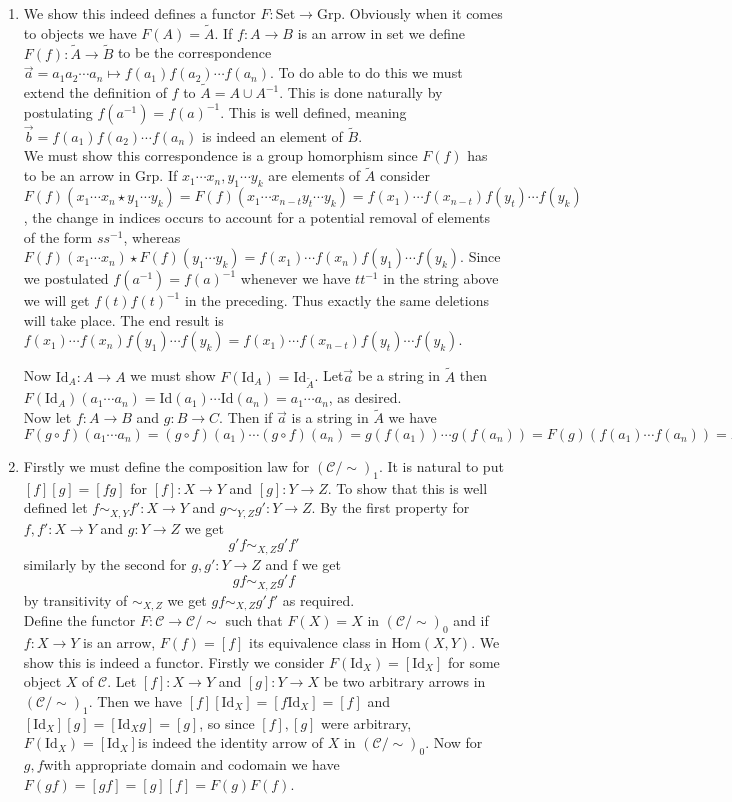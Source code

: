 \documentclass[11pt]{article}
\theoremstyle{plain}
\theoremstyle{definition}
\theoremstyle{remark}
\newcommand{\cC}{\mathcal{C}}
\newcommand{\Hom}{\mathrm{Hom}}
\begin{document}
\begin{exercises}
\begin{enumerate}
\item We show this indeed defines a functor $F:\text{Set} \to \text{Grp}$.
Obviously when it comes to objects we have $F(A)=\tilde{A}$. If $f:A \to B$ is an arrow in set we define $F(f): \tilde{A} \to \tilde{B}$ to be the correspondence $\vec{a}=a_1a_2\cdots a_n \mapsto f(a_1)f(a_2)\cdots f(a_n)$. To do able to do this we must extend the definition of $f$ to $\tilde{A}=A \cup A^{-1}$. This is done naturally by postulating $f(a^{-1})=f(a)^{-1}$. This is well defined, meaning $ \vec{b}=f(a_1)f(a_2)\cdots f(a_n)$ is indeed an element of $\tilde{B}$.\\
 We must show this correspondence is a group homorphism since $F(f)$ has to be an arrow in Grp. If $x_1 \cdots x_n, y_1\cdots y_k$ are elements of $\tilde{A}$ consider $F(f)(x_1 \cdots x_n\star y_1\cdots y_k)=F(f)(x_1\cdots x_{n-t}y_t\cdots y_k)=f(x_1)\cdots f(x_{n-t}) f(y_t) \cdots f(y_k)$, the change in indices occurs to account for a potential removal of elements of the form $ss^{-1}$, whereas $F(f)(x_1\cdots x_n) \star F(f)(y_1 \cdots y_k)=f(x_1) \cdots f(x_n) f(y_1) \cdots f(y_k)$. Since we postulated $f(a^{-1})=f(a)^{-1}$ whenever we have $tt^{-1}$ in the string above we will get $f(t)f(t)^{-1}$ in the preceding. Thus exactly the same deletions will take place. The end result is $f(x_1) \cdots f(x_n) f(y_1) \cdots f(y_k)=f(x_1) \cdots f(x_{n-t}) f(y_t) \cdots f(y_k)$.

Now $\text{Id}_A:A \to A$ we must show $F(\text{Id}_A)=\text{Id}_{\tilde{A}}$. Let$\vec{a}$ be a string in $\tilde{A}$ then $F(\text{Id}_A)(a_1\cdots a_n)=\text{Id}(a_1) \cdots \text{Id}(a_n)=a_1 \cdots a_n$, as desired.\\ 
Now let $f:A \to B$ and $g:B \to C$. Then if $\vec{a}$ is a string in $\tilde{A}$ we have $F( g \circ f)(a_1 \cdots a_n)=( g \circ f)(a_1) \cdots ( g \circ f)(a_n)=g(f(a_1)) \cdots g(f(a_n))=F(g)( f(a_1) \cdots f(a_n))=F(g)(F(f)(a_1 \cdots a_n))=(F(g) \circ F(f)) (a_1 \cdots a_n)$

\item Firstly we must define the composition law for $(\cC/\sim)_1$. It is natural to put $[f][g]=[fg]$ for $[f]:X \to Y$ and $[g]:Y \to Z$. To show that this is well defined let $ f \sim_{X,Y} f' :X \to Y$ and $g \sim_{Y,Z} g':Y \to Z$. By the first property for $f,f': X\to Y$ and $g:Y \to Z$ we get \[ g'f \sim_{X,Z} g'f'\] similarly by the second for $g,g':Y \to Z$ and f we get \[gf \sim_{X,Z} g'f\] by transitivity of $\sim_{X,Z}$ we get $gf \sim_{X,Z} g'f'$ as required.\\	
Define the functor $F:\cC \to \cC/\sim$ such that $F(X)=X$ in $(\cC/\sim)_0$ and if $f:X \to Y$ is an arrow, $F(f)=[f]$ its equivalence class in $\Hom(X,Y)$. We show this is indeed a functor. Firstly we consider $F(\text{Id}_X)=[\text{Id}_X]$ for some object $X$ of $\cC$. Let $[f]:X \to Y$ and $[g]: Y \to X$ be two arbitrary arrows in $(\cC/\sim)_1$.
 Then we have $[f][\text{Id}_X]=[f\text{Id}_X]=[f]$ and $[\text{Id}_X][g]=[\text{Id}_X g]=[g]$, so since $[f], [g]$ were arbitrary, $F(\text{Id}_X)=[\text{Id}_X]$is indeed the identity arrow of $X$ in $(\cC/\sim)_0$. Now for  $g,f$with appropriate domain and codomain we have $F(gf)=[gf]=[g][f]=F(g)F(f)$.
 

\end{enumerate}
\end{exercises}
\end{document}
